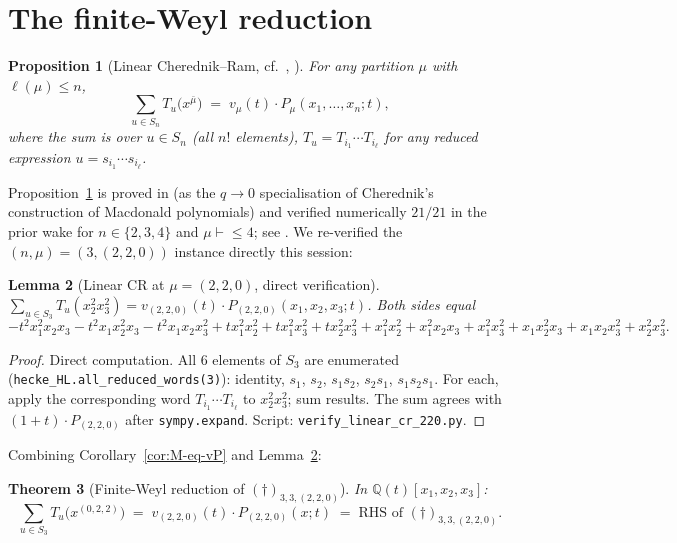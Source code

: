 \documentclass[11pt]{article}
\newtheorem{theorem}{Theorem}
\newtheorem{lemma}[theorem]{Lemma}
\newtheorem{proposition}[theorem]{Proposition}
\theoremstyle{definition}
\newcommand{\bmu}{\bar{\mu}}
\newcommand{\Q}{\mathbb{Q}}
\newcommand{\Sn}{S_n}
\newcommand{\dgg}{\dagger}
\begin{document}
\section{The finite-Weyl reduction}
\label{sec:finite-reduction}

\begin{proposition}[Linear Cherednik--Ram, cf.\ \cite{CR}, \cite{ClioLinear}]
\label{prop:linear-cr}
For any partition $\mu$ with $\ell(\mu) \le n$,
\[
\sum_{u \in \Sn} T_u\bigl(x^{\bmu}\bigr) \;=\; v_\mu(t) \cdot P_\mu(x_1, \ldots, x_n; t),
\]
where the sum is over $u \in \Sn$ (all $n!$ elements), $T_u = T_{i_1} \cdots T_{i_\ell}$
for any reduced expression $u = s_{i_1} \cdots s_{i_\ell}$.
\end{proposition}

Proposition~\ref{prop:linear-cr} is proved in \cite{CR} (as the $q \to 0$
specialisation of Cherednik's construction of Macdonald polynomials) and
verified numerically $21/21$ in the prior wake for $n \in \{2, 3, 4\}$ and
$\mu \vdash \le 4$; see \cite[Prop.~2.1]{ClioLinear}. We re-verified the
$(n, \mu) = (3, (2,2,0))$ instance directly this session:

\begin{lemma}[Linear CR at $\mu = (2,2,0)$, direct verification]
\label{lem:linear-cr-220}
$\sum_{u \in S_3} T_u(x_2^2 x_3^2) = v_{(2,2,0)}(t) \cdot P_{(2,2,0)}(x_1, x_2, x_3; t)$.
Both sides equal
\[
   -t^2 x_1^2 x_2 x_3 - t^2 x_1 x_2^2 x_3 - t^2 x_1 x_2 x_3^2
   + t x_1^2 x_2^2 + t x_1^2 x_3^2 + t x_2^2 x_3^2
   + x_1^2 x_2^2 + x_1^2 x_2 x_3 + x_1^2 x_3^2 + x_1 x_2^2 x_3 + x_1 x_2 x_3^2 + x_2^2 x_3^2.
\]
\end{lemma}

\begin{proof}
Direct computation. All $6$ elements of $S_3$ are enumerated
(\verb|hecke_HL.all_reduced_words(3)|):
identity, $s_1$, $s_2$, $s_1 s_2$, $s_2 s_1$, $s_1 s_2 s_1$.
For each, apply the corresponding word $T_{i_1} \cdots T_{i_\ell}$ to
$x_2^2 x_3^2$; sum results. The sum agrees with $(1+t) \cdot P_{(2,2,0)}$
after \verb|sympy.expand|. Script:
\verb|verify_linear_cr_220.py|.
\end{proof}

Combining Corollary~\ref{cor:M-eq-vP} and Lemma~\ref{lem:linear-cr-220}:

\begin{theorem}[Finite-Weyl reduction of $(\dgg)_{3,3,(2,2,0)}$]
\label{thm:interior-reduction}
In $\Q(t)[x_1, x_2, x_3]$:
\[
\sum_{u \in S_3} T_u\bigl(x^{(0,2,2)}\bigr)
\;=\; v_{(2,2,0)}(t) \cdot P_{(2,2,0)}(x; t)
\;=\; \text{RHS of $(\dgg)_{3,3,(2,2,0)}$.}
\]
\end{theorem}
\end{document}
